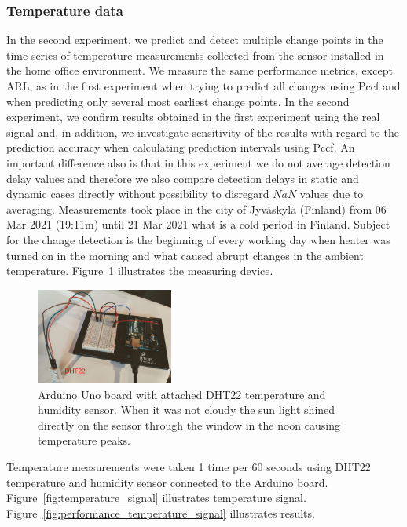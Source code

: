 \subsubsection{Temperature data}
In the second experiment, we predict and detect multiple change points in the time series of temperature measurements collected from the sensor installed in the home office environment.
We measure the same performance metrics, except ARL, as in the first experiment when trying to predict all changes using Pccf and when predicting only several most earliest change points.
In the second experiment, we confirm results obtained in the first experiment using the real signal and, in addition, we investigate sensitivity of the results with regard to the prediction accuracy when calculating prediction intervals using Pccf.
An important difference also is that in this experiment we do not average detection delay values and therefore we also compare detection delays in static and dynamic cases directly without possibility to disregard $NaN$ values due to averaging.
Measurements took place in the city of Jyv\"{a}skyl\"{a} (Finland) from 06 Mar 2021 (19:11m) until 21 Mar 2021 what is a cold period in Finland.
Subject for the change detection is the beginning of every working day when heater was turned on in the morning and what caused abrupt changes in the ambient temperature.
Figure~\ref{fig:dht22} illustrates the measuring device.
\begin{figure}[htb!]
	\centering
	\includegraphics[width=0.4\textwidth]{articles/pics/journal_paper/DHT22.png}
	\caption{
		Arduino Uno board with attached DHT22 temperature and humidity sensor.
		When it was not cloudy the sun light shined directly on the sensor through the window in the noon causing temperature peaks.
	}
	\label{fig:dht22}
\end{figure}
Temperature measurements were taken 1 time per 60 seconds using DHT22 temperature and humidity sensor connected to the Arduino board.
Figure~\ref{fig:temperature_signal} illustrates temperature signal.
Figure~\ref{fig:performance_temperature_signal} illustrates results.
